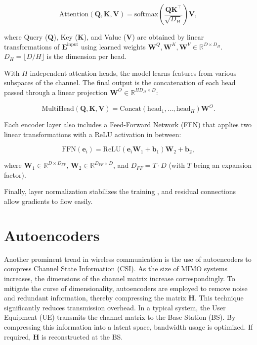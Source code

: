 \begin{equation}
    \text{Attention}(\mathbf{Q}, \mathbf{K}, \mathbf{V}) = \text{softmax} \left( \frac{\mathbf{Q} \mathbf{K}^{\top}}{ \sqrt{D_H}} \right) \mathbf{V},
\end{equation}

where Query ($\mathbf{Q}$), Key ($\mathbf{K}$), and Value ($\mathbf{V}$) are obtained by linear transformations of $\mathbf{E}^{\text{input}}$ using learned weights $\mathbf{W}^{Q}, \mathbf{W}^{K}, \mathbf{W}^{V} \in \mathbb{R}^{D \times D_H}$. $D_H = \lfloor D / H \rfloor$ is the dimension per head.

With $H$ independent attention heads, the model learns features from various subspaces of the channel. The final output is the concatenation of each head passed through a linear projection $\mathbf{W}^{O} \in \mathbb{R}^{H D_H \times D}$:

\begin{equation}
    \text{MultiHead}(\mathbf{Q}, \mathbf{K}, \mathbf{V}) = \text{Concat}(\text{head}_1, \dots, \text{head}_H) \mathbf{W}^{O}.
\end{equation}

Each encoder layer also includes a Feed-Forward Network (FFN) that applies two linear transformations with a ReLU activation in between:

\begin{equation}
    \text{FFN}(\mathbf{e}_i) = \text{ReLU} \left( \mathbf{e}_i \mathbf{W}_{1} + \mathbf{b}_{1}\right) \mathbf{W}_{2} + \mathbf{b}_{2},
\end{equation}

where $\mathbf{W}_{1} \in \mathbb{R}^{D \times D_{FF}}$, $\mathbf{W}_{2} \in \mathbb{R}^{D_{FF} \times D}$, and $D_{FF} = T \cdot D$ (with $T$ being an expansion factor).

Finally, layer normalization stabilizes the training \cite{ba2016layer}, and residual connections allow gradients to flow easily.

\section{Autoencoders}\label{sec:autoencoder}

Another prominent trend in wireless communication is the use of autoencoders to compress Channel State Information (CSI). As the size of MIMO systems increases, the dimensions of the channel matrix increase correspondingly. 
To mitigate the curse of dimensionality, autoencoders are employed to remove noise and redundant information, thereby compressing the matrix $\mathbf{H}$. This technique significantly reduces transmission overhead.
In a typical system, the User Equipment (UE) transmits the channel matrix to the Base Station (BS).
By compressing this information into a latent space, bandwidth usage is optimized. If required, $\mathbf{H}$ is reconstructed at the BS.

